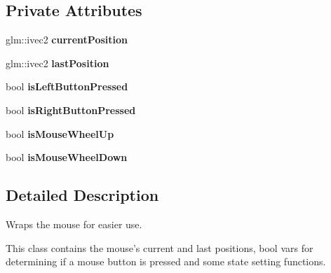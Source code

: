 \subsection*{Private Attributes}
\begin{DoxyCompactItemize}
\item 
\hypertarget{class_mouse_a23de5346b95b99e240c766824640a6fc}{glm\-::ivec2 {\bfseries current\-Position}}\label{class_mouse_a23de5346b95b99e240c766824640a6fc}

\item 
\hypertarget{class_mouse_a10021f004e04a5ab192790b8f265efe4}{glm\-::ivec2 {\bfseries last\-Position}}\label{class_mouse_a10021f004e04a5ab192790b8f265efe4}

\item 
\hypertarget{class_mouse_a387a8919aa655fbb0b09c2b5f1ad6dfe}{bool {\bfseries is\-Left\-Button\-Pressed}}\label{class_mouse_a387a8919aa655fbb0b09c2b5f1ad6dfe}

\item 
\hypertarget{class_mouse_a61da3e5ad642c686f9fb8316c66dbb80}{bool {\bfseries is\-Right\-Button\-Pressed}}\label{class_mouse_a61da3e5ad642c686f9fb8316c66dbb80}

\item 
\hypertarget{class_mouse_a74c2f303d33a9344b4efd24fbc5a6832}{bool {\bfseries is\-Mouse\-Wheel\-Up}}\label{class_mouse_a74c2f303d33a9344b4efd24fbc5a6832}

\item 
\hypertarget{class_mouse_a7ab05c0490c388d3e30f49119784c6a1}{bool {\bfseries is\-Mouse\-Wheel\-Down}}\label{class_mouse_a7ab05c0490c388d3e30f49119784c6a1}

\end{DoxyCompactItemize}


\subsection{Detailed Description}
Wraps the mouse for easier use. 

This class contains the mouse's current and last positions, {\ttfamily bool} vars for determining if a mouse button is pressed and some state setting functions. 

